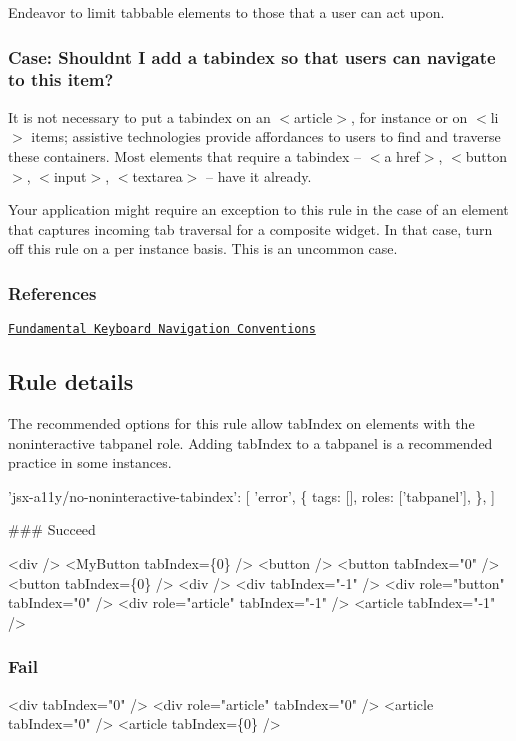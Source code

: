 Endeavor to limit tabbable elements to those that a user can act upon.

\subsubsection*{Case\+: Shouldn\textquotesingle{}t I add a tabindex so that users can navigate to this item?}



It is not necessary to put a tabindex on an {\ttfamily $<$article$>$}, for instance or on {\ttfamily $<$li$>$} items; assistive technologies provide affordances to users to find and traverse these containers. Most elements that require a tabindex -- {\ttfamily $<$a href$>$}, {\ttfamily $<$button$>$}, {\ttfamily $<$input$>$}, {\ttfamily $<$textarea$>$} -- have it already.

Your application might require an exception to this rule in the case of an element that captures incoming tab traversal for a composite widget. In that case, turn off this rule on a per instance basis. This is an uncommon case.

\subsubsection*{References}




\begin{DoxyEnumerate}
\item \href{https://www.w3.org/TR/wai-aria-practices-1.1/#kbd_generalnav}{\tt Fundamental Keyboard Navigation Conventions}
\end{DoxyEnumerate}

\subsection*{Rule details}



The recommended options for this rule allow {\ttfamily tab\+Index} on elements with the noninteractive {\ttfamily tabpanel} role. Adding {\ttfamily tab\+Index} to a tabpanel is a recommended practice in some instances.


\begin{DoxyCode}
'jsx-a11y/no-noninteractive-tabindex': [
  'error',
  \{
    tags: [],
    roles: ['tabpanel'],
  \},
]
\end{DoxyCode}


\#\#\# Succeed 
\begin{DoxyCode}
<div />
<MyButton tabIndex=\{0\} />
<button />
<button tabIndex="0" />
<button tabIndex=\{0\} />
<div />
<div tabIndex="-1" />
<div role="button" tabIndex="0" />
<div role="article" tabIndex="-1" />
<article tabIndex="-1" />
\end{DoxyCode}


\subsubsection*{Fail}

 
\begin{DoxyCode}
<div tabIndex="0" />
<div role="article" tabIndex="0" />
<article tabIndex="0" />
<article tabIndex=\{0\} />
\end{DoxyCode}
 